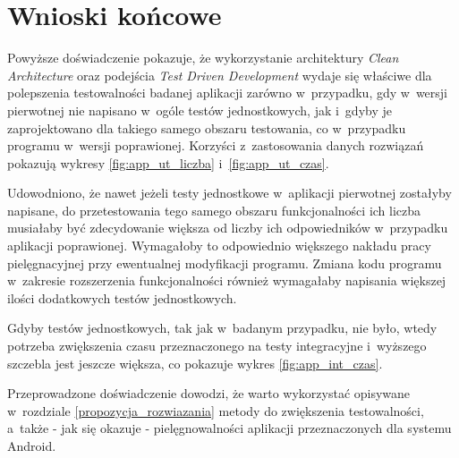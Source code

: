 \newpage
\section{Wnioski końcowe}
Powyższe doświadczenie pokazuje, że wykorzystanie architektury \textit{Clean Architecture} oraz podejścia \textit{Test Driven Development} wydaje się właściwe dla polepszenia testowalności badanej aplikacji zarówno w~przypadku, gdy w~wersji pierwotnej nie napisano w~ogóle testów jednostkowych, jak i~gdyby je zaprojektowano dla takiego samego obszaru testowania, co w~przypadku programu w~wersji poprawionej. Korzyści z~zastosowania danych rozwiązań pokazują wykresy \ref{fig:app_ut_liczba} i~\ref{fig:app_ut_czas}.

Udowodniono, że nawet jeżeli testy jednostkowe w~aplikacji pierwotnej zostałyby napisane, do przetestowania tego samego obszaru funkcjonalności ich liczba musiałaby być zdecydowanie większa od liczby ich odpowiedników w~przypadku aplikacji poprawionej. Wymagałoby to odpowiednio większego nakładu pracy pielęgnacyjnej przy ewentualnej modyfikacji programu. Zmiana kodu programu w~zakresie rozszerzenia funkcjonalności również wymagałaby napisania większej ilości dodatkowych testów jednostkowych.

Gdyby testów jednostkowych, tak jak w~badanym przypadku, nie było, wtedy potrzeba zwiększenia czasu przeznaczonego na testy integracyjne i~wyższego szczebla jest jeszcze większa, co pokazuje wykres \ref{fig:app_int_czas}.

Przeprowadzone doświadczenie dowodzi, że warto wykorzystać opisywane w~rozdziale \ref{propozycja_rozwiazania} metody do zwiększenia testowalności, a~także - jak się okazuje - pielęgnowalności aplikacji przeznaczonych dla systemu Android. 